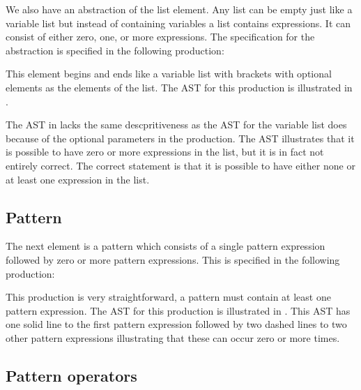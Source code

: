 We also have an abstraction of the list element. Any list can be empty just like a variable list but instead of containing variables a list contains expressions. It can consist of either zero, one, or more expressions. The specification for the abstraction is specified in the following production:

\begin{ebnf}
\end{ebnf}

This element begins and ends like a variable list with brackets with optional elements as the elements of the list. The AST for this production is illustrated in .



The AST in  lacks the same descpritiveness as the AST for the variable list does because of the optional parameters in the production. The AST illustrates that it is possible to have zero or more expressions in the list, but it is in fact not entirely correct. The correct statement is that it is possible to have either none or at least one expression in the list.

\subsection{Pattern}

The next element is a pattern which consists of a single pattern expression followed by zero or more pattern expressions. This is specified in the following production:

\begin{ebnf}
\end{ebnf}

This production is very straightforward, a pattern must contain at least one pattern expression. The AST for this production is illustrated in . This AST has one solid line to the first pattern expression followed by two dashed lines to two other pattern expressions illustrating that these can occur zero or more times.



\subsection{Pattern operators}


